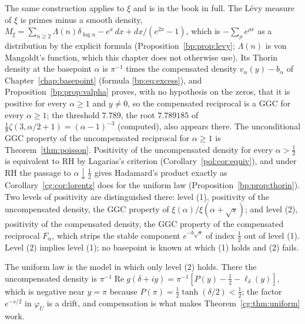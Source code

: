 The same construction applies to $\xi$ and is in the book in full. The L\'evy measure of $\xi$ is primes minus a smooth density, $M_\xi=\sum_{n\ge2}\Lambda(n)\delta_{\log n}-e^x\,dx+dx/(e^{2x}-1)$, which is $-\sum_\rho e^{\rho x}$ as a distribution by the explicit formula (Proposition~\ref{bp:prop:levy}; $\Lambda(n)$ is von Mangoldt's function, which this chapter does not otherwise use). Its Thorin density at the basepoint $\alpha$ is $\pi^{-1}$ times the compensated density $v_\alpha(y)-b_\alpha$ of Chapter~\ref{chap:basepoint} (formula \eqref{bp:eq:excess}), and Proposition~\ref{bp:prop:valpha} proves, with no hypothesis on the zeros, that it is positive for every $\alpha\ge1$ and $y\ne0$, so the compensated reciprocal is a GGC for every $\alpha\ge1$; the threshold $7.789$, the root $7.789185$ of $\frac18\zeta(3,\alpha/2+1)=(\alpha-1)^{-3}$ (computed), also appears there. The unconditional GGC property of the uncompensated reciprocal for $\alpha\ge1$ is Theorem~\ref{thm:poisson}. Positivity of the uncompensated density for every $\alpha>\frac12$ is equivalent to RH by Lagarias's criterion (Corollary~\ref{pol:cor:equiv}), and under RH the passage to $\alpha\downarrow\frac12$ gives Hadamard's product exactly as Corollary~\ref{cg:cor:lorentz} does for the uniform law (Proposition~\ref{bp:prop:thorin}). Two levels of positivity are distinguished there: level (1), positivity of the uncompensated density, the GGC property of $\xi(\alpha)/\xi(\alpha+\sqrt s)$; and level (2), positivity of the compensated density, the GGC property of the compensated reciprocal $F_\alpha$, which strips the stable component $e^{-b\sqrt s}$ of index $\frac12$ out of level (1). Level (2) implies level (1); no basepoint is known at which (1) holds and (2) fails.

The uniform law is the model in which only level (2) holds. There the uncompensated density is $\pi^{-1}\operatorname{Re}g(\delta+iy)=\pi^{-1}[P(y)-\frac12-\ell_\delta(y)]$, which is negative near $y=\pi$ because $P(\pi)=\frac12\tanh(\delta/2)<\frac12$; the factor $e^{-s/2}$ in $\varphi_U$ is a drift, and compensation is what makes Theorem~\ref{cg:thm:uniform} work.

